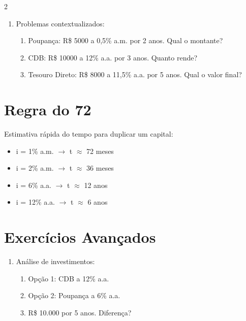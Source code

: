 \documentclass[11pt]{article}
\begin{document}
\begin{multicols}{2}
\begin{enumerate}
\item Problemas contextualizados:
\begin{enumerate}[label=\alph*)]
\item Poupança: R\$ 5000 a 0,5\% a.m. por 2 anos. Qual o montante?
\item CDB: R\$ 10000 a 12\% a.a. por 3 anos. Quanto rende?
\item Tesouro Direto: R\$ 8000 a 11,5\% a.a. por 5 anos. Qual o valor final?
\end{enumerate}

\end{enumerate}

\section*{Regra do 72}


Estimativa rápida do tempo para duplicar um capital:

\begin{itemize}
\item i = 1\% a.m. $\rightarrow$ t $\approx$ 72 meses
\item i = 2\% a.m. $\rightarrow$ t $\approx$ 36 meses
\item i = 6\% a.a. $\rightarrow$ t $\approx$ 12 anos
\item i = 12\% a.a. $\rightarrow$ t $\approx$ 6 anos
\end{itemize}

\section*{Exercícios Avançados}

\begin{enumerate}[leftmargin=*, start=9]

\item Análise de investimentos:
\begin{enumerate}[label=\alph*)]
\item Opção 1: CDB a 12\% a.a.
\item Opção 2: Poupança a 6\% a.a.
\item R\$ 10.000 por 5 anos. Diferença?
\end{enumerate}


\end{enumerate}
\end{multicols}
\end{document}

